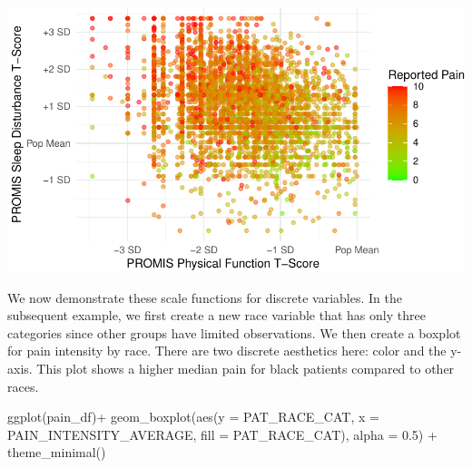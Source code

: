 \documentclass[
  letterpaper,
]{latex/krantz}
\makeatletter
\newenvironment{Shaded}{\begin{snugshade}}{\end{snugshade}}
\newcommand{\AttributeTok}[1]{\textcolor[rgb]{0.40,0.45,0.13}{#1}}
\newcommand{\FloatTok}[1]{\textcolor[rgb]{0.68,0.00,0.00}{#1}}
\newcommand{\FunctionTok}[1]{\textcolor[rgb]{0.28,0.35,0.67}{#1}}
\newcommand{\NormalTok}[1]{\textcolor[rgb]{0.00,0.23,0.31}{#1}}
\newcommand{\OtherTok}[1]{\textcolor[rgb]{0.00,0.23,0.31}{#1}}
\newcommand{\SpecialCharTok}[1]{\textcolor[rgb]{0.37,0.37,0.37}{#1}}
\newcommand{\StringTok}[1]{\textcolor[rgb]{0.13,0.47,0.30}{#1}}
\newenvironment{kframe}{%
\medskip{}
\setlength{\fboxsep}{.8em}
 \def\at@end@of@kframe{}%
 \ifinner\ifhmode%
  \def\at@end@of@kframe{\end{minipage}}%
  \begin{minipage}{\columnwidth}%
 \fi\fi%
 \def\FrameCommand##1{\hskip\@totalleftmargin \hskip-\fboxsep
 \colorbox{shadecolor}{##1}\hskip-\fboxsep
     \hskip-\linewidth \hskip-\@totalleftmargin \hskip\columnwidth}%
 \MakeFramed {\advance\hsize-\width
   \@totalleftmargin\z@ \linewidth\hsize
   \@setminipage}}%
 {\par\unskip\endMakeFramed%
 \at@end@of@kframe}
\renewenvironment{Shaded}{\begin{kframe}}{\end{kframe}}
\makeatother
\begin{document}
\begin{center}
\includegraphics[width=1\textwidth,height=\textheight]{book/visualization_ggplot_files/figure-pdf/unnamed-chunk-10-1.pdf}
\end{center}

We now demonstrate these scale functions for discrete variables. In the
subsequent example, we first create a new race variable that has only
three categories since other groups have limited observations. We then
create a boxplot for pain intensity by race. There are two discrete
aesthetics here: color and the y-axis. This plot shows a higher median
pain for black patients compared to other races.

\begin{Shaded}
\end{Shaded}

\begin{Shaded}
\begin{Highlighting}[]
\FunctionTok{ggplot}\NormalTok{(pain\_df)}\SpecialCharTok{+}
  \FunctionTok{geom\_boxplot}\NormalTok{(}\FunctionTok{aes}\NormalTok{(}\AttributeTok{y =}\NormalTok{ PAT\_RACE\_CAT, }\AttributeTok{x =}\NormalTok{ PAIN\_INTENSITY\_AVERAGE, }
                   \AttributeTok{fill =}\NormalTok{ PAT\_RACE\_CAT), }\AttributeTok{alpha =} \FloatTok{0.5}\NormalTok{) }\SpecialCharTok{+}
  \FunctionTok{theme\_minimal}\NormalTok{()}
\end{Highlighting}
\end{Shaded}
\end{document}
